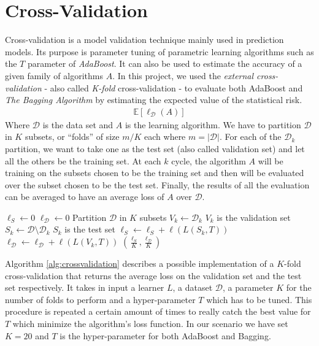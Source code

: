 
\chapter{Cross-Validation}
Cross-validation is a model validation technique mainly used in prediction models. Its purpose is parameter tuning of parametric learning algorithms such as the $T$ parameter of \textit{AdaBoost}. It can also be used to estimate the accuracy of a given family of algorithms $A$. In this project, we used the \textit{external cross-validation} - also called \textit{K-fold} cross-validation - to evaluate both AdaBoost and \textit{The Bagging Algorithm} by estimating the expected value of the statistical risk.
\begin{align*}
	\mathbb{E}[\ell_{\mathcal{D}}(A)]
\end{align*}
Where $\mathcal{D}$ is the data set and $A$ is the learning algorithm. We have to partition $\mathcal{D}$ in $K$ subsets, or ``folds'' of size $m/K$ each where $m = |\mathcal{D}|$. For each of the $\mathcal{D}_{k}$ partition, we want to take one as the test set (also called validation set) and let all the others be the training set. At each $k$ cycle, the algorithm $A$ will be training on the subsets chosen to be the training set and then will be evaluated over the subset chosen to be the test set. Finally, the results of all the evaluation can be averaged to have an average loss of $A$ over $\mathcal{D}$.

\begin{algorithm}[]
	\caption{}
	\label{alg:crossvalidation}
	\begin{algorithmic}[1]
		\State $\ell_{S} \gets 0$
		\State $\ell_{\mathcal{D}} \gets 0$
		\State Partition $\mathcal{D}$ in $K$ subsets
			\State $V_{k} \gets \mathcal{D}_{k}$ \Comment $V_{k}$ is the validation set
			\State $S_{k} \gets \mathcal{D}\setminus\mathcal{D}_{k}$ \Comment $S_{k}$ is the test set
			\State $\ell_{S} \gets \ell_{S} + \ell(L(S_{k}, T))$
			\State $\ell_{\mathcal{D}} \gets \ell_{\mathcal{D}} + \ell(L(V_{k}, T)) $
		\EndFor
		\Return $(\frac{\ell_{S}}{K},\frac{\ell_{\mathcal{D}}}{K})$
		\EndProcedure
	\end{algorithmic}
\end{algorithm}

Algorithm \ref{alg:crossvalidation} describes a possible implementation of a $K$-fold cross-validation that returns the average loss on the validation set and the test set respectively. It takes in input a learner $L$, a dataset $\mathcal{D}$, a parameter $K$ for the number of folds to perform and a hyper-parameter $T$ which has to be tuned. This procedure is repeated a certain amount of times to really catch the best value for $T$ which minimize the algorithm's loss function. In our scenario we have set $K=20$ and $T$ is the hyper-parameter for both AdaBoost and Bagging.